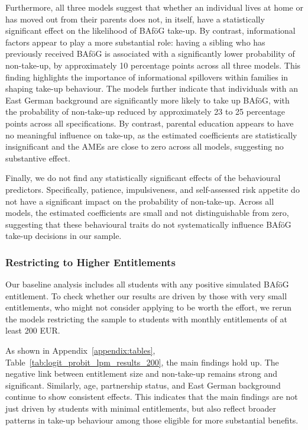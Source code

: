 Furthermore, all three models suggest that whether an individual lives at home or has moved out from their parents does not, in itself, have a statistically significant effect on the likelihood of BAföG take-up. 
By contrast, informational factors appear to play a more substantial role: having a sibling who has previously received BAföG is associated with a significantly lower probability of non-take-up, by approximately 10 percentage points across all three models. 
This finding highlights the importance of informational spillovers within families in shaping take-up behaviour. 
The models further indicate that individuals with an East German background are significantly more likely to take up BAföG, with the probability of non-take-up reduced by approximately 23 to 25 percentage points across all specifications. 
By contrast, parental education appears to have no meaningful influence on take-up, as the estimated coefficients are statistically insignificant and the AMEs are close to zero across all models, suggesting no substantive effect.

Finally, we do not find any statistically significant effects of the behavioural predictors. Specifically, patience, impulsiveness, and self-assessed risk appetite do not have a significant impact on the probability of non-take-up.
Across all models, the estimated coefficients are small and not distinguishable from zero, suggesting that these behavioural traits do not systematically influence BAföG take-up decisions in our sample.


\subsubsection{Restricting to Higher Entitlements}
Our baseline analysis includes all students with any positive simulated BAföG entitlement. 
To check whether our results are driven by those with very small entitlements, who might not consider applying to be worth the effort, we rerun the models restricting the sample to students with monthly entitlements of at least 200 EUR.

As shown in Appendix~\ref{appendix:tables}, Table~\ref{tab:logit_probit_lpm_results_200}, the main findings hold up. The negative link between entitlement size and non-take-up remains strong and significant. Similarly, age, partnership status, and East German background continue to show consistent effects. This indicates that the main findings are not just driven by students with minimal entitlements, but also reflect broader patterns in take-up behaviour among those eligible for more substantial benefits.

